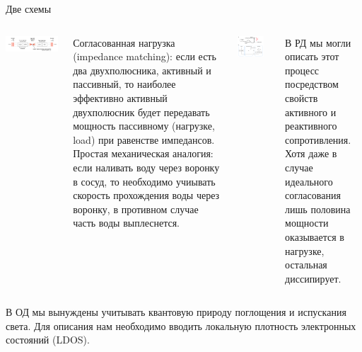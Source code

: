 \documentclass[9pt, compress, xcolor=table]{beamer}
\begin{document}
\begin{frame}{Две схемы}
\begin{columns}[c]
\column{6.3cm}
\begin{center}
\includegraphics[width=\textwidth]{optant51}
\end{center}

{\small \textcolor{red!50!black}{Согласованная нагрузка (impedance matching):} если есть два двухполюсника, активный и пассивный, то наиболее эффективно активный двухполюсник будет передавать мощность пассивному (нагрузке, load) при равенстве импедансов. Простая механическая аналогия: если наливать воду через воронку в сосуд, то необходимо учиывать скорость прохождения воды через воронку, в противном случае часть воды выплеснется.}


\column{6cm}
\begin{center}
\includegraphics[width=0.8\textwidth]{optant52}
\end{center}

{\small В РД мы могли описать этот процесс посредством свойств активного и реактивного сопротивления. Хотя даже в случае идеального согласования лишь половина мощности оказывается в нагрузке, остальная диссипирует.}
\end{columns}
 
 В ОД мы вынуждены учитывать квантовую природу поглощения и испускания света. Для описания нам необходимо вводить локальную плотность электронных состояний (LDOS).
\end{frame}
\end{document}

